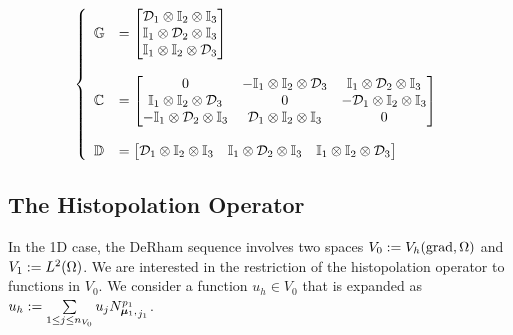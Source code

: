 \begin{align}
  \left\{ 
  \begin{array}{ll}
  \mathbb{G} &= 
    \begin{bmatrix}
      \mathcal{D}_1 \otimes \mathbb{I}_2 \otimes \mathbb{I}_3
      \\
      \mathbb{I}_1 \otimes \mathcal{D}_2 \otimes \mathbb{I}_3 
      \\
      \mathbb{I}_1 \otimes \mathbb{I}_2 \otimes \mathcal{D}_3
    \end{bmatrix}
  \\
  \\
  \mathbb{C} &= 
  \begin{bmatrix}
    0    &    - \mathbb{I}_1 \otimes \mathbb{I}_2 \otimes \mathcal{D}_3  &  \mathbb{I}_1 \otimes \mathcal{D}_2 \otimes \mathbb{I}_3 
    \\
    \mathbb{I}_1 \otimes \mathbb{I}_2 \otimes \mathcal{D}_3   &    0   &   - \mathcal{D}_1 \otimes \mathbb{I}_2 \otimes \mathbb{I}_3 
    \\
    - \mathbb{I}_1 \otimes \mathcal{D}_2 \otimes \mathbb{I}_3  & \mathcal{D}_1 \otimes \mathbb{I}_2 \otimes \mathbb{I}_3 & 0 
  \end{bmatrix} 
  \\
  \\
  \mathbb{D} &= 
    \begin{bmatrix}
      \mathcal{D}_1 \otimes \mathbb{I}_2 \otimes \mathbb{I}_3
      & 
      \mathbb{I}_1 \otimes \mathcal{D}_2 \otimes \mathbb{I}_3 
      &
      \mathbb{I}_1 \otimes \mathbb{I}_2 \otimes \mathcal{D}_3
    \end{bmatrix}
  \end{array} \right.
  \label{eq:discrete-derivatives-3d}
\end{align}
\subsection{The Histopolation Operator}
In the 1D case, the DeRham sequence involves two spaces $V_0 := V_h(\mbox{grad}, \Omega)$ and $V_1 := L^2(\Omega)$. We are interested in the restriction of the histopolation operator to functions in $V_0$. We consider a function $u_h \in V_0$ that is expanded as $u_h := \sum\limits_{1 \le j \le n_{V_0}} u_j {N_{\boldsymbol{\mu}_1,}^{p_1}}_{j_1}$. 

